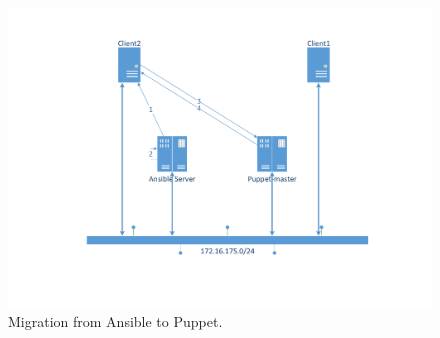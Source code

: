 \begin{figure}[!hb]
    \begin{center}
        \includegraphics[scale=0.55]{img/AnsibletoPuppet.pdf}
        \caption{Migration from Ansible to Puppet.}
        \label{fig:situation2}
    \end{center}
\end{figure}

\begin{lstlisting}
    
\end{lstlisting}


